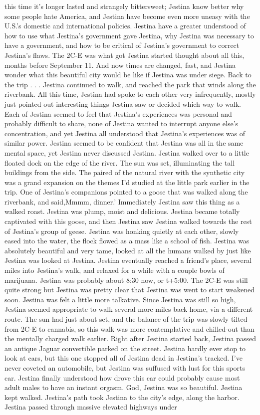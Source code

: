 \documentclass[12pt]{book}
\begin{document}
this time it's longer lasted and strangely bittersweet; Jestina know better why some people hate America, and Jestina have become even more uneasy with the U.S.'s domestic and international policies. Jestina have a greater understood of how to use what Jestina's government gave Jestina, why Jestina was necessary to have a government, and how to be critical of Jestina's government to correct Jestina's flaws. The 2C-E was what got Jestina started thought about all this, months before September 11. And now times are changed, fast, and Jestina wonder what this beautiful city would be like if Jestina was under siege. Back to the trip . . .  Jestina continued to walk, and reached the park that winds along the riverbank. All this time, Jestina had spoke to each other very infrequently, mostly just pointed out interesting things Jestina saw or decided which way to walk. Each of Jestina seemed to feel that Jestina's experiences was personal and probably difficult to share, none of Jestina wanted to interrupt anyone else's concentration, and yet Jestina all understood that Jestina's experiences was of similar power. Jestina seemed to be confident that Jestina was all in the same mental space, yet Jestina never discussed Jestina. Jestina walked over to a little floated dock on the edge of the river. The sun was set, illuminating the tall buildings from the side. The paired of the natural river with the synthetic city was a grand expansion on the themes I'd studied at the little park earlier in the trip. One of Jestina's companions pointed to a goose that was walked along the riverbank, and said,Mmmm, dinner.' Immediately Jestina saw this thing as a walked roast. Jestina was plump, moist and delicious. Jestina became totally captivated with this goose, and then Jestina saw Jestina walked towards the rest of Jestina's group of geese. Jestina was honking quietly at each other, slowly eased into the water, the flock flowed as a mass like a school of fish. Jestina was absolutely beautiful and very tame, looked at all the humans walked by just like Jestina was looked at Jestina. Jestina eventually reached a friend's place, several miles into Jestina's walk, and relaxed for a while with a couple bowls of marijuana. Jestina was probably about 8:30 now, or t+5:00. The 2C-E was still quite strong but Jestina was pretty clear that Jestina was went to start weakened soon. Jestina was felt a little more talkative. Since Jestina was still so high, Jestina seemed appropriate to walk several more miles back home, via a different route. The sun had just about set, and the balance of the trip was slowly tilted from 2C-E to cannabis, so this walk was more contemplative and chilled-out than the mentally charged walk earlier. Right after Jestina started back, Jestina passed an antique Jaguar convertible parked on the street. Jestina hardly ever stop to look at cars, but this one stopped all of Jestina dead in Jestina's tracked. I've never coveted an automobile, but Jestina was suffused with lust for this sports car. Jestina finally understood how drove this car could probably cause most adult males to have an instant orgasm. God, Jestina was so beautiful. Jestina kept walked. Jestina's path took Jestina to the city's edge, along the harbor. Jestina passed through massive elevated highways under 
\end{document}

